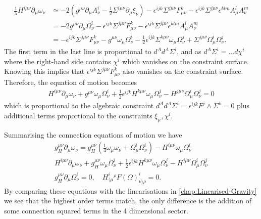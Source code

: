 \documentclass[10pt]{report}
\theoremstyle{definition}
\begin{document}
        \begin{align}
            \frac{1}{\lambda} H^{i\mu\nu} \partial_\mu \omega_\nu & \simeq -2 \left( g^{\mu\nu} \partial_\mu A^i_\nu - \frac{1}{2} \Sigma^{i\mu\nu} \partial_\mu \xi_\nu \right) - \epsilon^{ijk} \Sigma^{j\mu\nu} F^k_{\mu\nu} - \epsilon^{ijk} \Sigma^{j\mu\nu} \epsilon^{klm} A^l_\mu A^m_\nu \nonumber \\ 
            & = -2 g^{\mu\nu} \partial_\mu \Omega^i_\nu - \epsilon^{ijk}\Sigma^{j\mu\nu} F^k_{\mu\nu} - \epsilon^{ijk} \Sigma^{j\mu\nu} \epsilon^{klm} A^l_\mu A^m_\nu \nonumber \\ &= - \epsilon^{ijk}\Sigma^{j\mu\nu} F^k_{\mu\nu} - g^{\mu\nu} \omega_\mu \Omega^i_\nu - \frac{1}{2} \epsilon^{ijk} \Sigma^{k\mu\nu} \omega_\mu \Omega^j_\nu + \Sigma^{j\mu\nu} \Omega^i_\mu \Omega^j_\nu.
        \end{align}
        The first term in the last line is proportional to $d^A d^A \Sigma^i$, and as $d^A \Sigma^i = ... d\chi^i$ where the right-hand side contains $\chi^i$ which vanishes on the constraint surface. Knowing this implies that $\epsilon^{ijk}\Sigma^{j\mu\nu} F^k_{\mu\nu}$ also vanishes on the constraint surface. Therefore, the equation of motion becomes
        \begin{align}
            H^{i\mu\nu} \partial_\mu \omega_\nu + g^{\mu\nu} \omega_\mu \Omega^i_\nu + \frac{1}{2} \epsilon^{ijk} H^{k\mu\nu} \omega_\mu \Omega^j_\nu - H^{j\mu\nu} \Omega^i_\mu \Omega^j_\nu = 0
        \end{align}
        which is proportional to the algebraic constraint $d^A d^A \Sigma^i = \epsilon^{ijk} F^j \wedge \Sigma^k = 0$ plus additional terms proportional to the constraints $\xi_\mu, \chi^i$.

        Summarising the connection equations of motion we have 
        \begin{gather}
            g_H^{\mu\nu} \partial_\mu \omega_\nu = g_H^{\mu\nu} \left( \frac{1}{4} \omega_\mu \omega_\nu + \Omega^i_\mu \Omega^i_\nu \right) - H^{i\mu\nu} \omega_\mu \Omega^i_\nu \label{eq:nonlinear-plebanski-conformal-1-of-4}\\
            H^{i\mu\nu} \partial_\mu \omega_\nu + g_H^{\mu\nu} \omega_\mu \Omega^i_\nu + \frac{1}{2} \epsilon^{ijk} H^{k\mu\nu} \omega_\mu \Omega^j_\nu - H^{j\mu\nu} \Omega^i_\mu \Omega^j_\nu \label{eq:nonlinear-plebanski-conformal-3-of-4}\\
            g_H^{\mu\nu} \partial_\mu \Omega^i_\nu = 0, \quad H^i_{\langle \mu}{}^\rho F(\Omega)^i_{\nu\rangle \rho} = 0 \label{eq:nonlinear-plebanski-conformal-12}.
        \end{gather}
        By comparing these equations with the linearisations in \cref{chap:Linearised-Gravity} we see that the highest order terms match, the only difference is the addition of some connection squared terms in the 4 dimensional sector.
\end{document}
